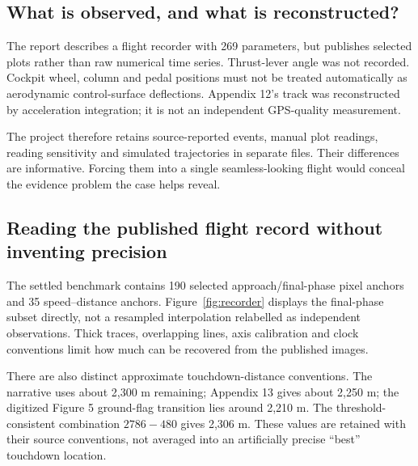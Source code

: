 \subsection*{What is observed, and what is reconstructed?}
The report describes a flight recorder with 269 parameters, but publishes selected plots rather than raw numerical time series. Thrust-lever angle was not recorded. Cockpit wheel, column and pedal positions must not be treated automatically as aerodynamic control-surface deflections. Appendix 12's track was reconstructed by acceleration integration; it is not an independent GPS-quality measurement.

The project therefore retains source-reported events, manual plot readings, reading sensitivity and simulated trajectories in separate files. Their differences are informative. Forcing them into a single seamless-looking flight would conceal the evidence problem the case helps reveal.
\par\medskip
\subsection*{Reading the published flight record without inventing precision}

The settled benchmark contains 190 selected approach/final-phase pixel anchors and 35 speed--distance anchors. Figure~\ref{fig:recorder} displays the final-phase subset directly, not a resampled interpolation relabelled as independent observations. Thick traces, overlapping lines, axis calibration and clock conventions limit how much can be recovered from the published images.

There are also distinct approximate touchdown-distance conventions. The narrative uses about 2,300 m remaining; Appendix 13 gives about 2,250 m; the digitized Figure 5 ground-flag transition lies around 2,210 m. The threshold-consistent combination $2786-480$ gives 2,306 m. These values are retained with their source conventions, not averaged into an artificially precise ``best'' touchdown location.

